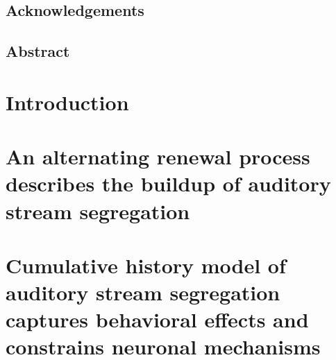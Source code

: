 \documentclass[letterpaper,12pt]{report}
\begin{document}
\section*{Acknowledgements} 
% 
\newpage
\newpage
\section*{Abstract}

\newpage
\tableofcontents

\listoffigures{}
\newpage


\chapter{Introduction}

% 
% 
\chapter{An alternating renewal process describes the buildup of auditory stream segregation}



\chapter{Cumulative history model of auditory stream segregation captures behavioral effects and constrains neuronal mechanisms}
\end{document}
